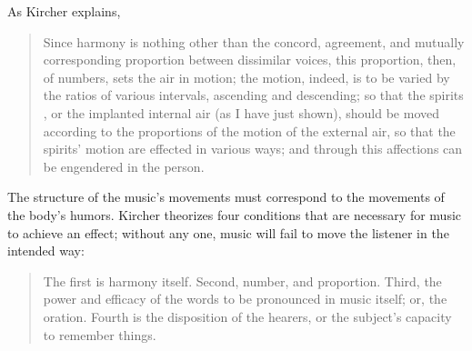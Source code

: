 As Kircher explains, 
\begin{quote}
    Since harmony is nothing other than the concord, agreement, and mutually corresponding proportion between dissimilar voices,
    this proportion, then, of numbers, sets the air in motion;
    the motion, indeed, is to be varied by the ratios of various intervals, ascending and descending;
    so that the spirits , or the implanted internal air (as I have just shown), should be moved according to the proportions of the motion of the external air, so that the spirits' motion are effected in various ways; and through this affections can be engendered in the person.%
        \Autocite
        [552: .]
        {Kircher:Musurgia}
\end{quote}

The structure of the music's movements must correspond to the movements of the body's humors.
Kircher theorizes four conditions that are necessary for music to achieve an effect; without any one, music will fail to move the listener in the intended way:
\begin{quote}
  The first is harmony itself.
  Second, number, and proportion.
  Third, the power and efficacy of the words to be pronounced in music itself; or, the oration.
  Fourth is the disposition of the hearers, or the subject's capacity to remember things.%
    \Autocite
    [550: .]
    {Kircher:Musurgia}
\end{quote}

